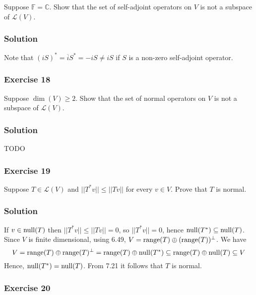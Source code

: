 Suppose $\mathbb{F} = \mathbb{C}$.
Show that the set of self-adjoint operators on $V$ is not a subspace of $\mathcal{L}(V)$.

\subsubsection*{Solution}

Note that $(i S)^* = \overline{i} S^* = -i S \neq i S$ if $S$ is a non-zero self-adjoint operator.


\subsubsection*{Exercise 18}

Suppose $\dim(V) \geq 2$.
Show that the set of normal operators on $V$ is not a subspace of $\mathcal{L}(V)$.

\subsubsection*{Solution}

TODO


\subsubsection*{Exercise 19}

Suppose $T \in \mathcal{L}(V)$ and $||T^*v|| \leq ||Tv||$ for every $v \in V$.
Prove that $T$ is normal.

\subsubsection*{Solution}

If $v \in \mathrm{null}(T)$ then $||T^*v|| \leq ||Tv|| = 0$, so $||T^*v|| = 0$, hence $\mathrm{null}(T^*) \subseteq \mathrm{null}(T)$.
Since $V$ is finite dimensional, using 6.49, $V = \mathrm{range}(T) \oplus (\mathrm{range}(T))^{\perp}$.
We have
\begin{equation*}
    V = \mathrm{range}(T) \oplus \mathrm{range}(T)^{\perp}
        = \mathrm{range}(T) \oplus \mathrm{null}(T^*)
        \subseteq \mathrm{range}(T) \oplus \mathrm{null}(T)
        \subseteq V
\end{equation*}
Hence, $\mathrm{null}(T^*) = \mathrm{null}(T)$.
From 7.21 it follows that $T$ is normal.


\subsubsection*{Exercise 20}

